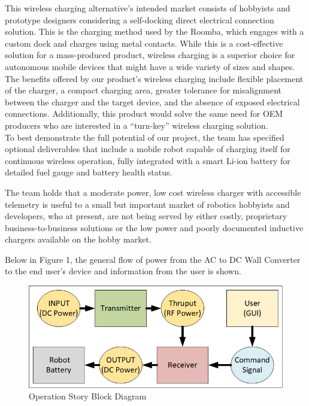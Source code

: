 \documentclass[12pt]{article}
\begin{document}
This wireless charging alternative's intended market consists of hobbyists and prototype designers considering a self-docking direct electrical connection solution. This is the charging method used by the Roomba\cite{RoombaEduData}, which engages with a custom dock and charges using metal contacts. While this is a cost-effective solution for a mass-produced product, wireless charging is a superior choice for autonomous mobile devices that might have a wide variety of sizes and shapes. The benefits offered by our product's wireless charging include flexible placement of the charger, a compact charging area, greater tolerance for misalignment between the charger and the target device, and the absence of exposed electrical connections.  Additionally, this product would solve the same need for OEM producers who are interested in a ``turn-key'' wireless charging solution.\\

\pagebreak
\indent
To best demonstrate the full potential of our project, the team has specified optional deliverables that include a mobile robot capable of charging itself for continuous wireless operation, fully integrated with a smart Li-ion battery for detailed fuel gauge and battery health status.\\ \indent %

The team holds that a moderate power, low cost wireless charger with accessible telemetry is useful to a small but important market of robotics hobbyists and developers, who at present, are not being served by either costly, proprietary business-to-business solutions or the low power and poorly documented inductive chargers available on the hobby market.\\ \indent

Below in Figure 1, the general flow of power from the AC to DC Wall Converter to the end user's device and information from the user is shown.
\hfill 
\begin{figure}[h!]
\centering
\includegraphics[width=0.84\linewidth]{black_box_power}
\caption{Operation Story Block Diagram}
\end{figure}
\end{document}
